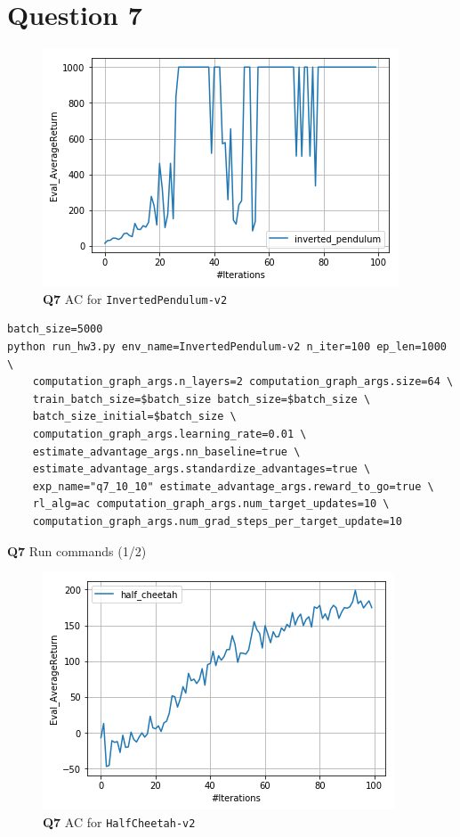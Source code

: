 \documentclass[11pt]{article}
\begin{document}
\clearpage
\section{Question 7}
\label{sec:org666db8e}

\begin{figure}[htbp]
\centering
\includegraphics[width=.9\linewidth]{./71.png}
\caption{\textbf{Q7} AC for \texttt{InvertedPendulum-v2}}
\end{figure}

\begin{listing}[htbp]
\begin{verbatim}
batch_size=5000
python run_hw3.py env_name=InvertedPendulum-v2 n_iter=100 ep_len=1000 \
    computation_graph_args.n_layers=2 computation_graph_args.size=64 \
    train_batch_size=$batch_size batch_size=$batch_size \
    batch_size_initial=$batch_size \
    computation_graph_args.learning_rate=0.01 \
    estimate_advantage_args.nn_baseline=true \
    estimate_advantage_args.standardize_advantages=true \
    exp_name="q7_10_10" estimate_advantage_args.reward_to_go=true \
    rl_alg=ac computation_graph_args.num_target_updates=10 \
    computation_graph_args.num_grad_steps_per_target_update=10
\end{verbatim}
\caption{\textbf{Q7} Run commands (1/2)}
\end{listing}

\begin{figure}[htbp]
\centering
\includegraphics[width=.9\linewidth]{./72.png}
\caption{\textbf{Q7} AC for \texttt{HalfCheetah-v2}}
\end{figure}
\end{document}
